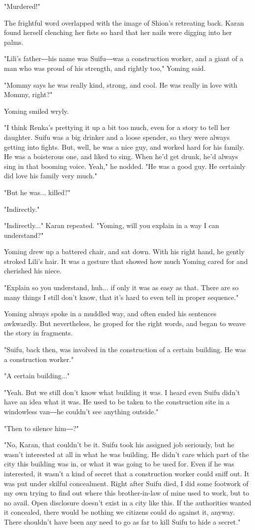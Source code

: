 "Murdered!"

The frightful word overlapped with the image of Shion's retreating back.
Karan found herself clenching her fists so hard that her nails were
digging into her palms.

"Lili's father―his name was Suifu―was a construction worker, and a giant
of a man who was proud of his strength, and rightly too," Yoming said.

"Mommy says he was really kind, strong, and cool. He was really in love
with Mommy, right?"

Yoming smiled wryly.

"I think Renka's prettying it up a bit too much, even for a story to
tell her daughter. Suifu was a big drinker and a loose spender, so they
were always getting into fights. But, well, he was a nice guy, and
worked hard for his family. He was a boisterous one, and liked to sing.
When he'd get drunk, he'd always sing in that booming voice. Yeah," he
nodded. "He was a good guy. He certainly did love his family very much."

"But he was... killed?"

"Indirectly."

"Indirectly..." Karan repeated. "Yoming, will you explain in a way I can
understand?"

Yoming drew up a battered chair, and sat down. With his right hand, he
gently stroked Lili's hair. It was a gesture that showed how much Yoming
cared for and cherished his niece.

"Explain so you understand, huh... if only it was as easy as that. There
are so many things I still don't know, that it's hard to even tell in
proper sequence."

Yoming always spoke in a muddled way, and often ended his sentences
awkwardly. But nevertheless, he groped for the right words, and began to
weave the story in fragments.

"Suifu, back then, was involved in the construction of a certain
building. He was a construction worker."

"A certain building..."

"Yeah. But we still don't know what building it was. I heard even Suifu
didn't have an idea what it was. He used to be taken to the construction
site in a windowless van―he couldn't see anything outside."

"Then to silence him―?"

"No, Karan, that couldn't be it. Suifu took his assigned job seriously,
but he wasn't interested at all in what he was building. He didn't care
which part of the city this building was in, or what it was going to be
used for. Even if he was interested, it wasn't a kind of secret that a
construction worker could sniff out. It was put under skilful
concealment. Right after Suifu died, I did some footwork of my own
trying to find out where this brother-in-law of mine used to work, but
to no avail. Open disclosure doesn't exist in a city like this. If the
authorities wanted it concealed, there would be nothing we citizens
could do against it, anyway. There shouldn't have been any need to go as
far to kill Suifu to hide a secret."

